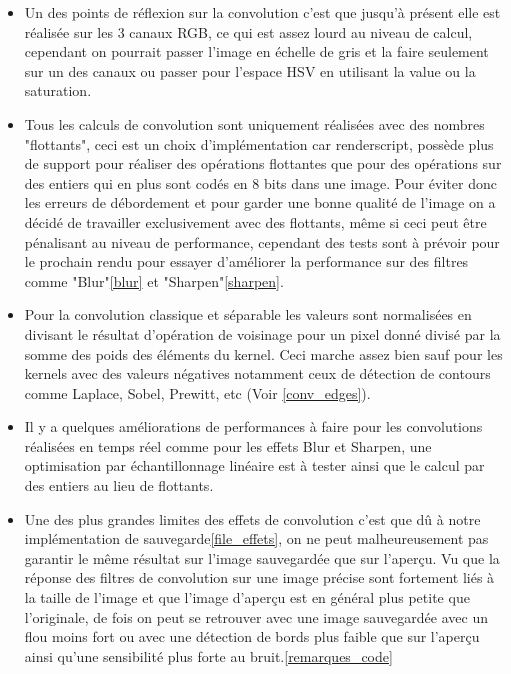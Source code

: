         
        \begin{itemize}
            \item {Un des points de réflexion sur la convolution c'est que jusqu'à présent elle est réalisée sur les 3 canaux RGB, ce qui est assez lourd au niveau de calcul,
            cependant on pourrait passer l'image en échelle de gris et la faire seulement sur un des canaux ou passer pour l'espace HSV en utilisant la value ou la saturation.}
            \item {Tous les calculs de convolution sont uniquement réalisées avec des nombres "flottants", ceci est un choix d'implémentation car renderscript, possède plus de support
            pour réaliser des opérations flottantes que pour des opérations sur des entiers qui en plus sont codés en 8 bits dans une image. Pour éviter donc les erreurs de débordement et pour garder une bonne qualité de l'image
            on a décidé de travailler exclusivement avec des flottants, même si ceci peut être pénalisant au niveau de performance, cependant des tests sont à prévoir pour le prochain rendu pour essayer
            d'améliorer la performance sur des filtres comme "Blur"\ref{blur} et "Sharpen"\ref{sharpen}.}
            \item {Pour la convolution classique et séparable les valeurs sont normalisées en divisant le résultat d'opération de voisinage pour un pixel donné
            divisé par la somme des poids des éléments du kernel. Ceci marche assez bien sauf pour les kernels avec des valeurs négatives notamment ceux de détection de contours comme Laplace, Sobel, Prewitt, etc (Voir \ref{conv_edges}).
            }

            \item {Il y a quelques améliorations de performances à faire pour les convolutions réalisées en temps réel comme pour les effets Blur et Sharpen, une optimisation par échantillonnage linéaire
            est à tester ainsi que le calcul par des entiers au lieu de flottants.}

            \item {Une des plus grandes limites des effets de convolution c'est que dû à notre implémentation de sauvegarde\ref{file_effets}, on ne peut malheureusement pas garantir le même résultat sur l'image sauvegardée que sur l'aperçu.
            Vu que la réponse des filtres de convolution sur une image précise sont fortement liés à la taille de l’image et que l'image d'aperçu est en général plus petite que l'originale, de fois on peut se retrouver avec une image sauvegardée avec un flou moins fort ou avec une détection de bords plus faible que sur l'aperçu
            ainsi qu'une sensibilité plus forte au bruit.\ref{remarques_code}}
        \end{itemize} 





        
